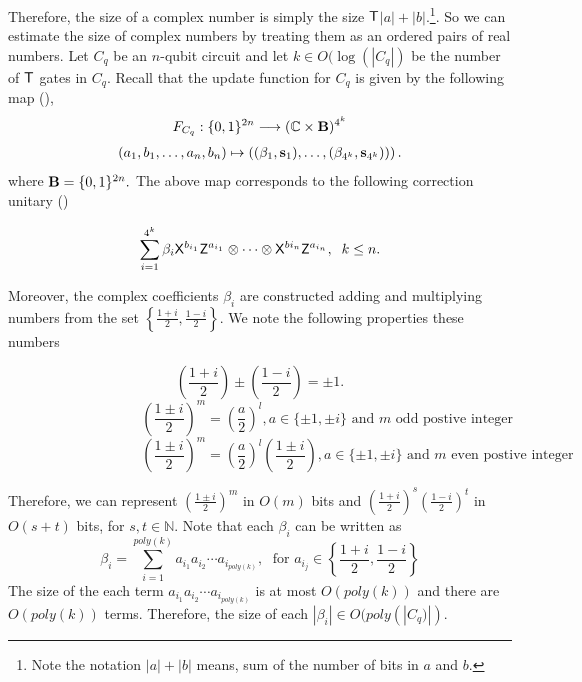 Therefore, the size of a complex number is simply the size ${\sf T}$$|a|+|b|.$\footnote{Note the notation $|a|+|b|$ means, sum of the number of bits in $a$ and $b.$}. So we can estimate the size of complex numbers by treating them as an ordered pairs of real numbers. Let $C_q$ be an $n$-qubit circuit and let $k\in O(\log(|C_q|)$ be the number of ${\sf T}$ gates in $C_q.$ Recall  that the update function for $C_q$ is given by the following map (),
\begin{equation}
\begin{aligned}
 F_{C_q}: \{0,1\}^{2n}\longrightarrow  (\mathbb{C} \times {\bf B})^{4^k}
 \end{aligned}
\end{equation}
\begin{equation}
\begin{aligned}
 (a_1,b_1,\ldots, a_n,b_n) \mapsto \left((\beta_1, {\bf s}_1),\dots, (\beta_{4^k}, {\bf s}_{4^k}))\right).
\end{aligned}
\end{equation}
where ${\bf B}=\{0,1\}^{2n}.$ The above map corresponds to the following correction unitary ()

 \begin{equation*}
\sum_{i=1}^{4^k} \beta_i {\sf X}^{b_{i_1}} {\sf Z}^{a_{i_1}}\otimes \cdots \otimes {\sf X}^{b{i_n}} {\sf Z}^{a_{i_n}},\;  \; k\leq n.
\end{equation*}

Moreover, the complex coefficients $\beta_i$ are constructed adding and multiplying numbers from the set $\left\{\frac{1+i}{2},\frac{1-i}{2}\right\}.$ We note the following properties these numbers

 $$\left(\frac{1+i}{2}\right)\pm \left(\frac{1-i}{2}\right)=\pm1.$$
$$ \hspace{4cm}\left(\frac{1\pm i}{2}\right)^m=\left(\frac{a}{2}\right)^l, a\in\{\pm 1,\pm i\} \mbox{ and $m$ odd postive integer}$$
 $$\hspace{4cm}\left(\frac{1\pm i}{2}\right)^m=\left(\frac{a}{2}\right)^l \left(\frac{1\pm i}{2}\right), a\in\{\pm 1,\pm i\}\mbox{ and  $m$ even postive integer}$$



 Therefore, we can represent $\left(\frac{1\pm i}{2}\right)^m$ in $O(m)$ bits  and $\left(\frac{1+ i}{2}\right)^{s} \left(\frac{1- i}{2}\right)^{t}$ in $O(s+t)$ bits, for $s,t\in\mathbb{N}.$
 Note that each $\beta_i$ can be written as
 $$\beta_i=\sum_{i=1}^{poly(k)}a_{i_1}a_{i_2}\cdots a_{i_{poly(k)}},\; \mbox{ for } a_{i_j}\in\left\{\frac{1+i}{2},\frac{1-i}{2}\right\}$$
The size of the each term $a_{i_1}a_{i_2}\cdots a_{i_{poly(k)}}$ is at most $O(poly(k))$ and there are $O(poly(k))$ terms. Therefore, the size of each $|\beta_i|\in O(poly(|C_q)|).$


